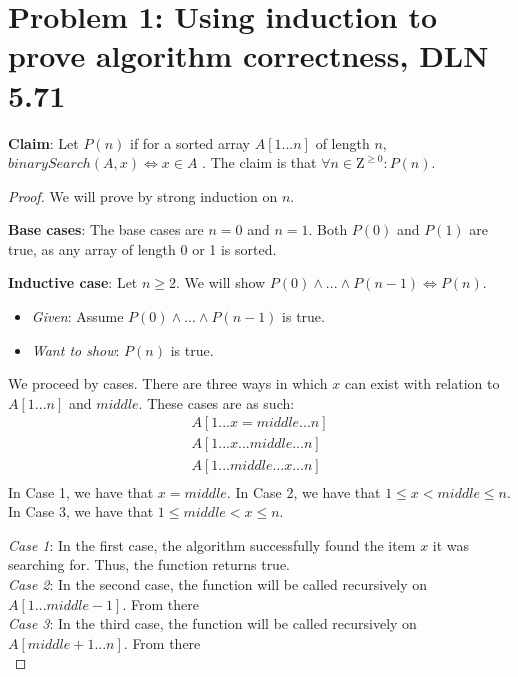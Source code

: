 \documentclass[titlepage]{article}
\begin{document}
 \maketitle

\section{Problem 1: Using induction to prove algorithm correctness, DLN 5.71}

\textbf{Claim}: Let $P(n)$ if for a sorted array $A[1...n]$ of length $n$, $binarySearch(A, x) \iff x \in A$ .  The claim is that $\forall n \in \mathrm{Z}^{\geq 0}: P(n)$.

\begin{proof}
We will prove by strong induction on $n$.

\textbf{Base cases}: The base cases are $n=0$ and $n=1$. Both $P(0)$ and $P(1)$ are true, as any array of length 0 or 1 is sorted.

\textbf{Inductive case}: Let $n \geq 2$.  We will show $P(0) \land ... \land P(n-1) \iff P(n)$.
\begin{itemize}
\item \emph{Given}: Assume $P(0) \land ... \land P(n-1)$ is true.
\item \emph{Want to show}: $P(n)$ is true.
\end{itemize}
We proceed by cases. There are three ways in which $x$ can exist with relation to $A[1...n]$ and $middle$. These cases are as such: 
\begin{align*}
A[1...x=middle...n] \\
A[1...x...middle...n] \\
A[1...middle...x...n] \\
\end{align*}
In Case 1, we have that $x = middle$. In Case 2, we have that $1 \leq x < middle \leq n$. In Case 3, we have that $1 \leq middle < x \leq n$.

\emph{Case 1}: In the first case, the algorithm successfully found the item $x$ it was searching for. Thus, the function returns true. \\
\emph{Case 2}: In the second case, the function will be called recursively on $A[1...middle-1]$. From there\\
\emph{Case 3}: In the third case, the function will be called recursively on $A[middle+1...n]$. From there\\

\end{proof}
\end{document}
